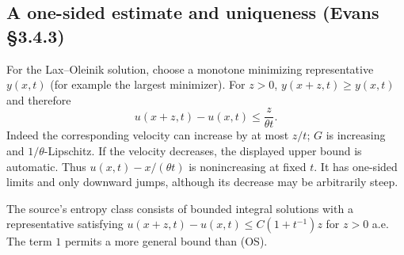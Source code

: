 \subsection{A one-sided estimate and uniqueness (Evans \S3.4.3)}
\label{sec:3-entropy}
For the Lax--Oleinik solution, choose a monotone minimizing
representative $y(x,t)$ (for example the largest minimizer).
For $z>0$,
$y(x+z,t)\geq y(x,t)$ and therefore
\[
 u(x+z,t)-u(x,t)\leq \frac{z}{\theta t}.
 \tag{OS}
\]
Indeed the corresponding velocity can increase by at most $z/t$;
$G$ is increasing and $1/\theta$-Lipschitz.
If the velocity decreases, the displayed upper bound is automatic.
Thus $u(x,t)-x/(\theta t)$ is nonincreasing at fixed $t$.
It has one-sided limits and only downward jumps, although its
decrease may be arbitrarily steep.
\Needspace{45mm}

The source's entropy class consists of bounded integral solutions
with a representative satisfying
$u(x+z,t)-u(x,t)\leq C(1+t^{-1})z$ for $z>0$ a.e.
The term $1$ permits a more general bound than (OS).

